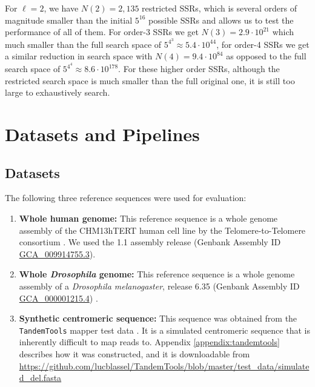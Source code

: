 \documentclass[
  11pt,
  twoside,
  BCOR=10mm,
  listof=totoc]{scrbook}
\begin{document}
For \(\ell=2\), we have \(N(2)=2,135\) restricted SSRs, which is several orders of magnitude smaller than the initial \(5^{16}\) possible SSRs and allows us to test the performance of all of them. For order-3 SSRs we get \(N(3)=2.9\cdot10^{21}\) which much smaller than the full search space of \(5^{4^3}\approx5.4\cdot10^{44}\), for order-4 SSRs we get a similar reduction in search space with \(N(4)=9.4\cdot10^{84}\) as opposed to the full search space of \(5^{4^4}\approx8.6\cdot10^{178}\). For these higher order SSRs, although the restricted search space is much smaller than the full original one, it is still too large to exhaustively search.

\hypertarget{datasets-and-pipelines}{%
\section{Datasets and Pipelines}\label{datasets-and-pipelines}}

\hypertarget{datasets}{%
\subsection{Datasets}\label{datasets}}

The following three reference sequences were used for evaluation:

\begin{enumerate}
\def\labelenumi{\arabic{enumi}.}
\item
  \textbf{Whole human genome:} This reference sequence is a whole genome assembly of the CHM13hTERT human cell line by the Telomere-to-Telomere consortium \autocite{nurk2022}. We used the 1.1 assembly release (Genbank Assembly ID \href{https://www.ncbi.nlm.nih.gov/assembly/GCA_009914755.3/}{GCA\_009914755.3}).
\item
  \textbf{Whole \emph{Drosophila} genome:} This reference sequence is a whole genome assembly of a \emph{Drosophila melanogaster}, release 6.35 (Genbank Assembly ID \href{https://www.ncbi.nlm.nih.gov/assembly/GCF_000001215.4/}{GCA\_000001215.4}) \autocite{adamsGenomeSequenceDrosophila2000}.
\item
  \textbf{Synthetic centromeric sequence:} This sequence was obtained from the \texttt{TandemTools} mapper test data \autocite{mikheenkoTandemToolsMappingLong2020}. It is a simulated centromeric sequence that is inherently difficult to map reads to. Appendix \ref{appendix:tandemtools} describes how it was constructed, and it is downloadable from \url{https://github.com/lucblassel/TandemTools/blob/master/test_data/simulated_del.fasta}
\end{enumerate}
\end{document}
